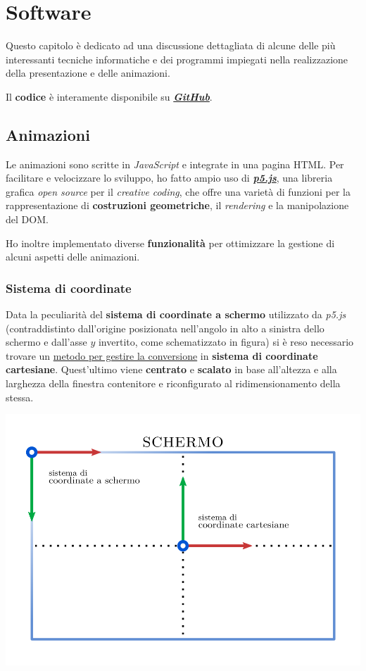 \documentclass[
]{book}
\begin{document}
\hypertarget{software}{%
\chapter{Software}\label{software}}

Questo capitolo è dedicato ad una discussione dettagliata di alcune delle più interessanti tecniche informatiche e dei programmi impiegati nella realizzazione della presentazione e delle animazioni.

Il \textbf{codice} è interamente disponibile su \href{https://github.com/Bradwave/thesis}{\emph{\textbf{GitHub}}}.

\hypertarget{softan}{%
\section{Animazioni}\label{softan}}

Le animazioni sono scritte in \emph{JavaScript} e integrate in una pagina HTML. Per facilitare e velocizzare lo sviluppo, ho fatto ampio uso di \href{https://p5js.org/}{\emph{\textbf{p5.js}}}, una libreria grafica \emph{open source} per il \emph{creative coding}, che offre una varietà di funzioni per la rappresentazione di \textbf{costruzioni geometriche}, il \emph{rendering} e la manipolazione del DOM.

Ho inoltre implementato diverse \textbf{funzionalità} per ottimizzare la gestione di alcuni aspetti delle animazioni.

\hypertarget{coordsystem}{%
\subsection{Sistema di coordinate}\label{coordsystem}}

Data la peculiarità del \textbf{sistema di coordinate a schermo} utilizzato da \emph{p5.js} (contraddistinto dall'origine posizionata nell'angolo in alto a sinistra dello schermo e dall'asse \(y\) invertito, come schematizzato in figura) si è reso necessario trovare un \href{https://github.com/Bradwave/thesis/blob/master/animations/js/utils/coordinateSystem.js}{metodo per gestire la conversione} in \textbf{sistema di coordinate cartesiane}. Quest'ultimo viene \textbf{centrato} e \textbf{scalato} in base all'altezza e alla larghezza della finestra contenitore e riconfigurato al ridimensionamento della stessa.

\begin{center}\includegraphics[width=0.6\linewidth]{_images/screen} \end{center}
\end{document}
